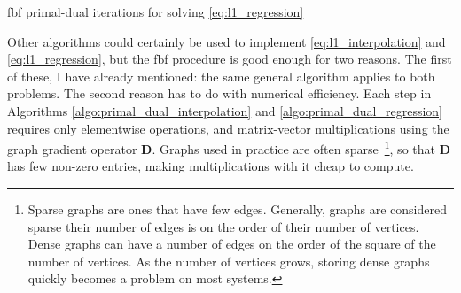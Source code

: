 \begin{algorithm}[H]
    \caption{\acrshort{fbf} primal-dual iterations for solving \eqref{eq:l1_regression}}
    \label{algo:primal_dual_regression}
    \begin{algorithmic}[1]
        \Repeat





    \end{algorithmic}
\end{algorithm}

Other algorithms could certainly be used to implement \eqref{eq:l1_interpolation} and \eqref{eq:l1_regression}, but the \acrshort{fbf} procedure is good enough for two reasons. The first of these, I have already mentioned: the same general algorithm applies to both problems. The second reason has to do with numerical efficiency. Each step in Algorithms \ref{algo:primal_dual_interpolation} and \ref{algo:primal_dual_regression} requires only elementwise operations, and matrix-vector multiplications using the graph gradient operator $\mathbf{D}$. Graphs used in practice are often sparse~\footnote{Sparse graphs are ones that have few edges. Generally, graphs are considered sparse their number of edges is on the order of their number of vertices. Dense graphs can have a number of edges on the order of the square of the number of vertices. As the number of vertices grows, storing dense graphs quickly becomes a problem on most systems.}, so that $\mathbf{D}$ has few non-zero entries, making multiplications with it cheap to compute.


